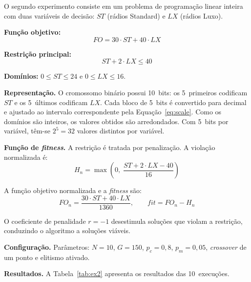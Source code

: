 \documentclass[12pt,twocolumn]{article}
\begin{document}
O segundo experimento consiste em um problema de programação linear inteira com duas
variáveis de decisão: $ST$ (rádios Standard) e $LX$ (rádios Luxo).

\textbf{Função objetivo:}
\begin{equation}
  FO = 30 \cdot ST + 40 \cdot LX
  \label{eq:fo2}
\end{equation}

\textbf{Restrição principal:}
\begin{equation}
  ST + 2 \cdot LX \le 40
  \label{eq:restricao}
\end{equation}

\textbf{Domínios:} $0 \le ST \le 24$ e $0 \le LX \le 16$.

\textbf{Representação.} O cromossomo binário possui 10~bits: os 5~primeiros codificam $ST$
e os 5~últimos codificam $LX$. Cada bloco de 5~bits é convertido para decimal e ajustado
ao intervalo correspondente pela Equação~\ref{eq:scale}. Como os domínios são inteiros, os
valores obtidos são arredondados. Com 5~bits por variável, têm-se $2^5 = 32$ valores
distintos por variável.

\textbf{Função de \textit{fitness}.} A restrição é tratada por penalização. A violação
normalizada é:
\begin{equation}
  H_n = \max\!\left(0,\; \frac{ST + 2 \cdot LX - 40}{16}\right)
  \label{eq:hn}
\end{equation}

A função objetivo normalizada e a \textit{fitness} são:
\begin{equation}
  FO_n = \frac{30 \cdot ST + 40 \cdot LX}{1360}, \qquad
  \mathit{fit} = FO_n - H_n
  \label{eq:fit2}
\end{equation}

O coeficiente de penalidade $r = -1$ desestimula soluções que violam a restrição,
conduzindo o algoritmo a soluções viáveis.

\textbf{Configuração.} Parâmetros: $N = 10$, $G = 150$, $p_c = 0{,}8$, $p_m = 0{,}05$,
\textit{crossover} de um ponto e elitismo ativado.

\textbf{Resultados.}
A Tabela~\ref{tab:ex2} apresenta os resultados das 10~execuções.
\end{document}
